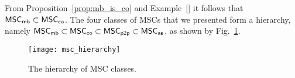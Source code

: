 \documentclass{article}
\begin{document}
From Proposition~\ref{prop:mb_is_co} and Example~\ref{} it follows that $\mathsf{MSC}_{\mathsf{mb}} \subset \mathsf{MSC}_{\mathsf{co}}$. The four classes of MSCs that we presented form a hierarchy, namely $\mathsf{MSC}_{\mathsf{mb}} \subset \mathsf{MSC}_{\mathsf{co}} \subset \mathsf{MSC}_{\mathsf{p2p}} \subset \mathsf{MSC}_{\mathsf{as}}$, as shown by Fig.~\ref{fig:msc_hierarchy}.

\begin{figure}[h]
	\centering
	\texttt{[image: msc\_hierarchy]}
	\caption{The hierarchy of MSC classes.}
	\label{fig:msc_hierarchy}
\end{figure}

\printbibliography
\end{document}
